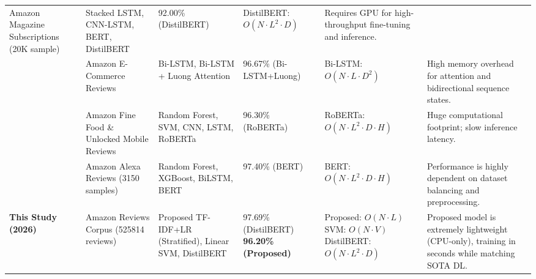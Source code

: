 \documentclass[authoryear,review,3p,times,12pt]{elsarticle}
\begin{document}
\begin{landscape}
\begin{longtable}{p{2cm}p{3.5cm}p{4cm}p{3cm}p{4cm}p{4.5cm}}
  Amazon Magazine Subscriptions (20K sample) &
  Stacked LSTM, CNN-LSTM, BERT, DistilBERT &
  92.00\% \newline(DistilBERT) &
  DistilBERT: $O(N \cdot L^2 \cdot D)$ &
  Requires GPU for high-throughput fine-tuning and inference. \\
\citep{mamyrbayev2026enhanced} &
  Amazon E-Commerce Reviews &
  Bi-LSTM, Bi-LSTM + Luong Attention &
  96.67\% \newline(Bi-LSTM+Luong) &
  Bi-LSTM: $O(N \cdot L \cdot D^2)$ &
  High memory overhead for attention and bidirectional sequence states. \\
\citep{daraghmi2026sentiment} &
  Amazon Fine Food \& Unlocked Mobile Reviews &
  Random Forest, SVM, CNN, LSTM, RoBERTa &
  96.30\% \newline(RoBERTa) &
  RoBERTa: $O(N \cdot L^2 \cdot D \cdot H)$ &
  Huge computational footprint; slow inference latency. \\
\citep{khan2026assessing} &
  Amazon Alexa Reviews (3150 samples) &
  Random Forest, XGBoost, BiLSTM, BERT &
  97.40\% \newline(BERT) &
  BERT: $O(N \cdot L^2 \cdot D \cdot H)$ &
  Performance is highly dependent on dataset balancing and preprocessing. \\ \hline
\textbf{This Study (2026)} &
  Amazon Reviews Corpus (525814 reviews) &
  Proposed TF-IDF+LR (Stratified), Linear SVM, DistilBERT &
  97.69\% \newline(DistilBERT) \newline \textbf{96.20\% \newline(Proposed)} &
  Proposed: $O(N \cdot L)$ \newline SVM: $O(N \cdot V)$ \newline DistilBERT: $O(N \cdot L^2 \cdot D)$ &
  Proposed model is extremely lightweight (CPU-only), training in seconds while matching SOTA DL. \\ \hline
\end{longtable}
\end{landscape}
\end{document}

